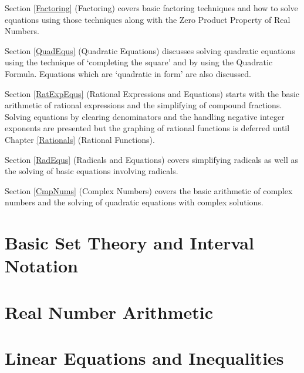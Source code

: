 \smallskip

Section \ref{Factoring} (Factoring) covers basic factoring techniques and how to solve equations using those techniques along with the Zero Product Property of Real Numbers.

\smallskip

Section \ref{QuadEqus} (Quadratic Equations) discusses solving quadratic equations using the technique of `completing the square' and by using the Quadratic Formula.  Equations which are `quadratic in form' are also discussed.

\smallskip

Section \ref{RatExpEqus} (Rational Expressions and Equations) starts with the basic arithmetic of rational expressions and the simplifying of compound fractions.  Solving equations by clearing denominators and the handling negative integer exponents are presented but the graphing of rational functions is deferred until Chapter \ref{Rationals}  (Rational Functions).

\smallskip

Section \ref{RadEqus} (Radicals and Equations) covers simplifying radicals as well as the solving of basic equations involving radicals.  

\smallskip

Section \ref{CmpNums} (Complex Numbers) covers the basic arithmetic of complex numbers and the solving of quadratic equations with complex solutions.

\newpage

\section{Basic Set Theory and Interval Notation}



\newpage

\section{Real Number Arithmetic}



\newpage

\section{Linear Equations and Inequalities}



\newpage

